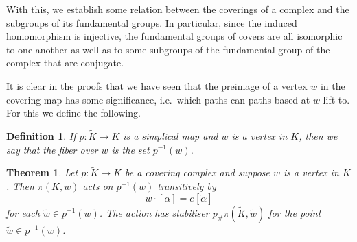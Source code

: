 \documentclass[12pt]{article}
\newtheorem{definition}{Definition}
\newtheorem{theorem}{Theorem}
\theoremstyle{definition}
\numberwithin{equation}{theorem}
\begin{document}
With this, we establish some relation between the coverings of a complex and the subgroups of its fundamental groups. In particular, since the induced homomorphism is injective, the fundamental groups of covers are all isomorphic to one another as well as to some subgroups of the fundamental group of the complex that are conjugate.

It is clear in the proofs that we have seen that the preimage of a vertex $w$ in the covering map has some significance, i.e.\ which paths can paths based at $w$ lift to. For this we define the following.


\begin{definition}
  If $p:\tilde{K} \rightarrow K$ is a simplical map and $w$ is a vertex in $K$, then we say that the \emph{fiber} over $w$ is the set $p^{-1}(w)$.
\end{definition}

\begin{theorem}
  Let $p:\tilde{K} \rightarrow K$ be a covering complex and suppose $w$ is a vertex in $K$. Then $\pi(K,w)$ acts on $p^{-1}(w)$ transitively by
  \begin{equation*}
    {\tilde{w}}\cdot[\alpha] = e[\tilde{\alpha}]
  \end{equation*}
  for each $\tilde{w} \in p^{-1}(w)$. The action has stabiliser $p_{\#}\pi(\tilde{K},\tilde{w})$ for the point $\tilde{w} \in p^{-1}(w)$.
\end{theorem}
\end{document}
